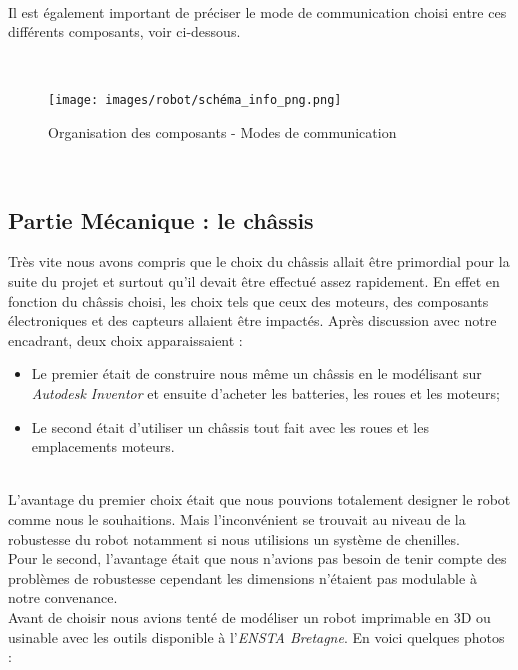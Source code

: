 \documentclass[french]{rapportENSTAB}
\begin{document}
\\

Il est également important de préciser le mode de communication choisi entre ces différents composants, voir ci-dessous.

\\

 
 \begin{figure}[H]
    \centering
    \texttt{[image: images/robot/schéma\_info\_png.png]}
    \caption{Organisation des composants - Modes de communication}
    \label{fig:cdcf}
\end{figure}

\\

\subsection{Partie Mécanique : le châssis}
Très vite nous avons compris que le choix du châssis allait être primordial pour la suite du projet et surtout qu'il devait être effectué assez rapidement. En effet en fonction du châssis choisi, les choix tels que ceux des moteurs, des composants électroniques et des capteurs allaient être impactés. Après discussion avec notre encadrant, deux choix apparaissaient : \begin{itemize}[label=\textbullet, font=\small\color{blue}]
    \item Le premier était de construire nous même un châssis en le modélisant sur \textit{Autodesk Inventor} et ensuite d'acheter les batteries, les roues et les moteurs;
    \item Le second était d'utiliser un châssis tout fait avec les roues et les emplacements moteurs.
\end{itemize}\\

L’avantage du premier choix était que nous pouvions totalement designer le robot comme nous le souhaitions. Mais l’inconvénient se trouvait au niveau de la robustesse du robot notamment si nous utilisions un système de chenilles. \\

Pour le second, l'avantage était que nous n’avions pas besoin de tenir compte des problèmes de robustesse cependant les dimensions n'étaient pas modulable à notre convenance. \\

Avant de choisir nous avions tenté de modéliser un robot imprimable en 3D ou usinable avec les outils disponible à l'\textit{ENSTA Bretagne}. En voici quelques photos :
\end{document}
